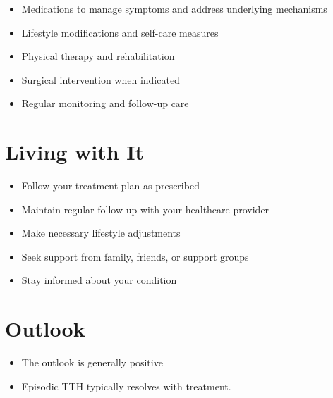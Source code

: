 \begin{itemize}[noitemsep]
  \item Medications to manage symptoms and address underlying mechanisms
  \item Lifestyle modifications and self-care measures
  \item Physical therapy and rehabilitation
  \item Surgical intervention when indicated
  \item Regular monitoring and follow-up care
\end{itemize}
\section{Living with It}
\begin{itemize}[noitemsep]
  \item Follow your treatment plan as prescribed
  \item Maintain regular follow-up with your healthcare provider
  \item Make necessary lifestyle adjustments
  \item Seek support from family, friends, or support groups
  \item Stay informed about your condition
\end{itemize}
\section{Outlook}
\begin{itemize}[noitemsep]
  \item The outlook is generally positive
  \item Episodic TTH typically resolves with treatment.
\end{itemize}
